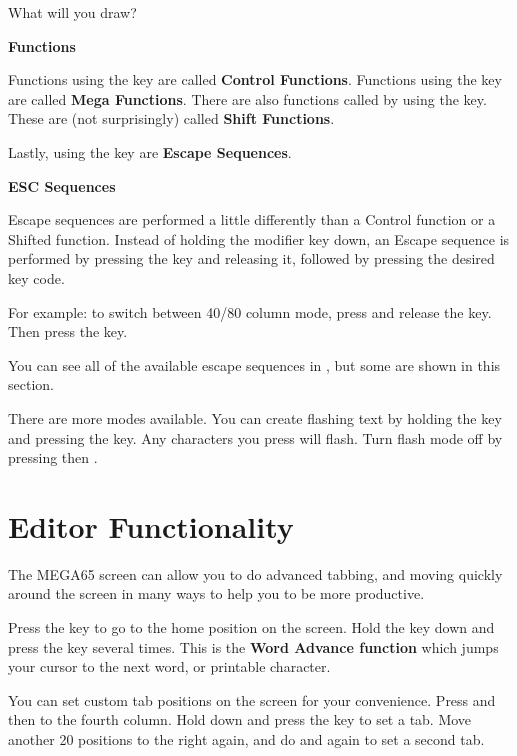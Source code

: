 What will you draw?

\needspace{2cm}
\textbf{Functions}

Functions using the  key are called \textbf{Control Functions}.
Functions using the \megasymbolkey key are called \textbf{Mega Functions}. There are also functions called by using the  key. These are (not surprisingly) called \textbf{Shift Functions}.

Lastly, using the  key are \textbf{Escape Sequences}.

\needspace{2cm}
\textbf{ESC Sequences}

Escape sequences are performed a little differently than a Control function or a Shifted function. Instead of holding the modifier key down, an Escape sequence is performed by pressing the  key and releasing it, followed by pressing the desired key code.

For example: to switch between 40/80 column mode, press and release the  key. Then press the  key.

You can see all of the available escape sequences in , but some are shown in this section.

There are more modes available. You can create flashing text by holding the  key and pressing the  key. Any characters you press will flash. Turn flash mode off by pressing  then .



\section{Editor Functionality}


The MEGA65 screen can allow you to do advanced tabbing, and moving quickly around the screen in many ways to help you to be more productive.

Press the  key to go to the home position on the screen. Hold the  key down and press the  key several times. This is the \textbf{Word Advance function} which jumps your cursor to the next word, or printable character.

You can set custom tab positions on the screen for your convenience. Press  and then \megakey{$\rightarrow$} to the fourth column. Hold down  and press the  key to set a tab. Move another 20 positions to the right again, and do  and  again to set a second tab.

